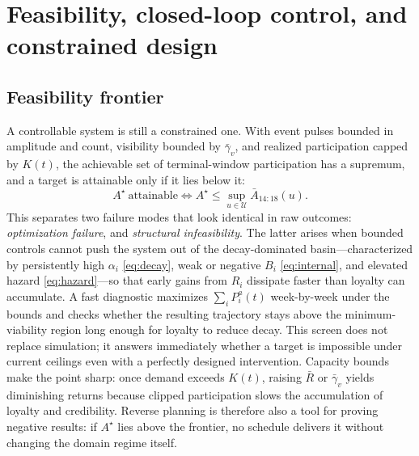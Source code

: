 \documentclass[11pt]{article}
\begin{document}
\section{Feasibility, closed-loop control, and constrained design}\label{sec:feasibility}

\subsection{Feasibility frontier}
A controllable system is still a constrained one. With event pulses bounded in amplitude and count, visibility bounded by $\bar\gamma_v$, and realized participation capped by $K(t)$, the achievable set of terminal-window participation has a supremum, and a target is attainable only if it lies below it:
\begin{equation*}
A^\star\ \text{attainable}\iff A^\star\le\sup_{u\in\mathcal U}\bar A_{14:18}(u).
\end{equation*}
This separates two failure modes that look identical in raw outcomes: \emph{optimization failure}, and \emph{structural infeasibility}. The latter arises when bounded controls cannot push the system out of the decay-dominated basin---characterized by persistently high $\alpha_i$ \eqref{eq:decay}, weak or negative $B_i$ \eqref{eq:internal}, and elevated hazard \eqref{eq:hazard}---so that early gains from $R_i$ dissipate faster than loyalty can accumulate. A fast diagnostic maximizes $\sum_i P^a_i(t)$ week-by-week under the bounds and checks whether the resulting trajectory stays above the minimum-viability region long enough for loyalty to reduce decay. This screen does not replace simulation; it answers immediately whether a target is impossible under current ceilings even with a perfectly designed intervention. Capacity bounds make the point sharp: once demand exceeds $K(t)$, raising $\bar R$ or $\bar\gamma_v$ yields diminishing returns because clipped participation slows the accumulation of loyalty and credibility. Reverse planning is therefore also a tool for proving negative results: if $A^\star$ lies above the frontier, no schedule delivers it without changing the domain regime itself.
\end{document}
